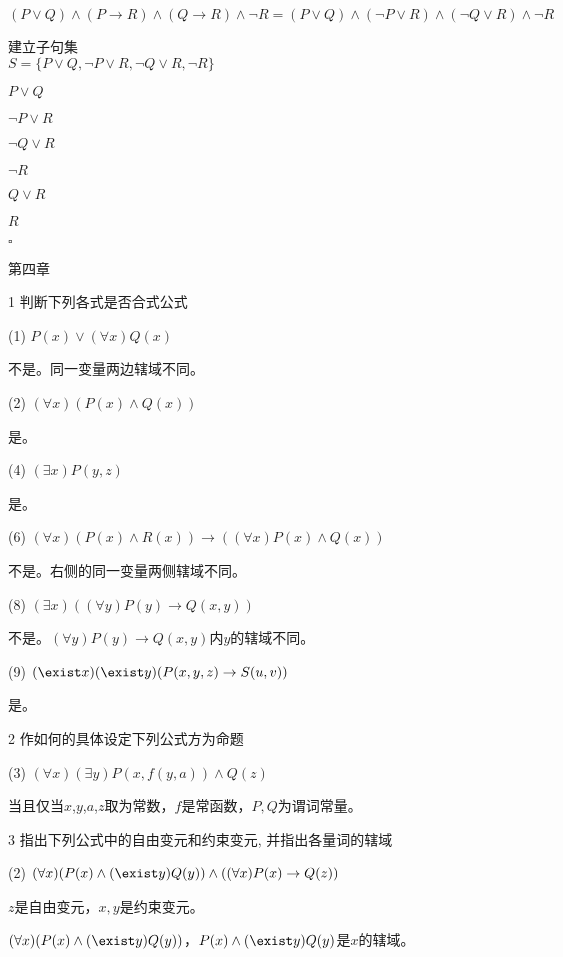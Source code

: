 \documentclass[
]{article}
\begin{document}
\(( P \vee Q) \wedge ( P \rightarrow R) \wedge (Q\rightarrow R)\wedge \neg R=( P \vee Q) \wedge ( \neg P \vee R) \wedge (\neg Q\vee R)\wedge \neg R\)

建立子句集\\
\(S=\{ P \vee Q, \neg P \vee R, \neg Q\vee R, \neg R \}\)

\(P \vee Q\)

\(\neg P \vee R\)

\(\neg Q\vee R\)

\(\neg R\)

\(Q\vee R\)

\(R\)

\(\square\)

第四章

1 判断下列各式是否合式公式

(1) \(P ( x ) \vee(\forall x )Q( x )\)

不是。同一变量两边辖域不同。

(2) \(( \forall x ) ( P ( x ) \wedge Q( x ) )\)

是。

(4) \(( \exists x ) P ( y , z )\)

是。

(6)
\(( \forall x ) ( P ( x ) \wedge R( x ) ) \rightarrow ( ( \forall x ) P ( x ) \wedge Q( x ) )\)

不是。右侧的同一变量两侧辖域不同。

(8) \(( \exists x ) ( ( \forall y) P ( y) \rightarrow  Q( x , y ) )\)

不是。\(( \forall y) P ( y) \rightarrow  Q( x , y )\)内\(y\)的辖域不同。

(9)
\(( \exist x ) ( \exist y ) ( P ( x , y , z ) \rightarrow S( u , v) )\)

是。

2 作如何的具体设定下列公式方为命题

(3) \(( \forall x ) ( \exists y ) P ( x , f ( y , a ) ) \wedge Q( z)\)

当且仅当\(x\),\(y\),\(a\),\(z\)取为常数，\(f\)是常函数，\(P,Q\)为谓词常量。

3 指出下列公式中的自由变元和约束变元, 并指出各量词的辖域

(2)
\(( \forall x ) ( P ( x ) \wedge ( \exist y )Q( y ) ) \wedge ( ( \forall x ) P ( x ) \rightarrow Q( z) )\)

\(z\)是自由变元，\(x,y\)是约束变元。

\(( \forall x ) ( P ( x ) \wedge ( \exist y )Q( y ) )\)，\(P ( x ) \wedge ( \exist y )Q( y )\)是\(x\)的辖域。
\end{document}
